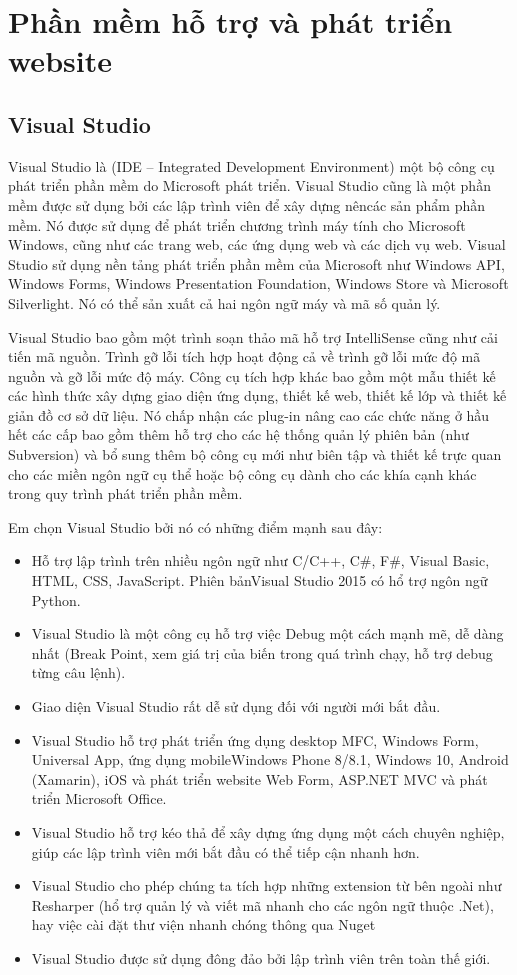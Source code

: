 \section{Phần mềm hỗ trợ và phát triển website}
\subsection{Visual Studio}
Visual Studio là (IDE – Integrated Development Environment) một bộ công cụ phát triển phần mềm do Microsoft phát triển. Visual Studio cũng là một phần mềm được sử dụng bởi các lập trình viên để xây dựng nêncác sản phẩm phần mềm. Nó được sử dụng để phát triển chương trình máy tính cho Microsoft Windows, cũng như các trang web, các ứng dụng web và các dịch vụ web. Visual Studio sử dụng nền tảng phát triển phần mềm của Microsoft như Windows API, Windows Forms, Windows Presentation Foundation, Windows Store và Microsoft Silverlight. Nó có thể sản xuất cả hai ngôn ngữ máy và mã số quản lý.
\par
Visual Studio bao gồm một trình soạn thảo mã hỗ trợ IntelliSense cũng như cải tiến mã nguồn. Trình gỡ lỗi tích hợp hoạt động cả về trình gỡ lỗi mức độ mã nguồn và gỡ lỗi mức độ máy. Công cụ tích hợp khác bao gồm một mẫu thiết kế các hình thức xây dựng giao diện ứng dụng, thiết kế web, thiết kế lớp và thiết kế giản đồ cơ sở dữ liệu. Nó chấp nhận các plug-in nâng cao các chức năng ở hầu hết các cấp bao gồm thêm hỗ trợ cho các hệ thống quản lý phiên bản (như Subversion) và bổ sung thêm bộ công cụ mới như biên tập và thiết kế trực quan cho các miền ngôn ngữ cụ thể hoặc bộ công cụ dành cho các khía cạnh khác trong quy trình phát triển phần mềm.
\par
Em chọn Visual Studio bởi nó có những điểm mạnh sau đây:
\begin{itemize}
	\item Hỗ trợ lập trình trên nhiều ngôn ngữ như C/C++, C\#, F\#, Visual Basic, HTML, CSS, JavaScript. Phiên bảnVisual Studio 2015 có hổ trợ ngôn ngữ Python.
	\item Visual Studio là một công cụ hỗ trợ việc Debug một cách mạnh mẽ, dễ dàng nhất (Break Point, xem giá trị của biến trong quá trình chạy, hỗ trợ debug từng câu lệnh).
	\item Giao diện Visual Studio rất dễ sử dụng đối với người mới bắt đầu.
	\item Visual Studio hỗ trợ phát triển ứng dụng desktop MFC, Windows Form, Universal App, ứng dụng mobileWindows Phone 8/8.1, Windows 10, Android (Xamarin), iOS và phát triển  website Web Form, ASP.NET MVC và phát triển Microsoft Office.
	\item Visual Studio hỗ trợ kéo thả để xây dựng ứng dụng một cách chuyên nghiệp, giúp các lập trình viên mới bắt đầu có thể tiếp cận nhanh hơn.
	\item Visual Studio cho phép chúng ta tích hợp những extension từ bên ngoài như Resharper (hổ trợ quản lý và viết mã nhanh cho các ngôn ngữ thuộc .Net), hay việc cài đặt thư viện nhanh chóng thông qua Nuget
	\item Visual Studio được sử dụng đông đảo bởi lập trình viên trên toàn thế giới.
\end{itemize}
